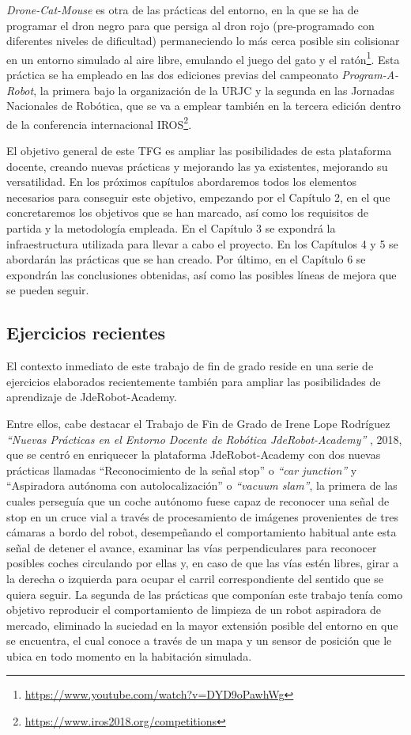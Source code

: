\textit{Drone-Cat-Mouse} es otra de las prácticas del entorno, en la que se ha de programar el dron negro para que persiga al dron rojo (pre-programado con diferentes niveles de dificultad) permaneciendo lo más cerca posible sin colisionar en un entorno simulado al aire libre, emulando el juego del gato y el ratón\footnote{\url{https://www.youtube.com/watch?v=DYD9oPawhWg}}. Esta práctica se  ha empleado en las dos ediciones previas del campeonato \textit{Program-A-Robot}, la primera bajo la organización de la URJC y la segunda en las Jornadas Nacionales de Robótica, que se va a emplear también en la tercera edición dentro de la conferencia internacional IROS\footnote{\url{https://www.iros2018.org/competitions}}.
\vspace{0.6cm}

El objetivo general de este TFG es ampliar las posibilidades de esta plataforma docente, creando nuevas prácticas y mejorando las ya existentes, mejorando su versatilidad. En los próximos capítulos abordaremos todos los elementos necesarios para conseguir este objetivo, empezando por el Capítulo 2, en el que concretaremos los objetivos que se han marcado, así como los requisitos de partida y la metodología empleada. En el Capítulo 3 se expondrá la infraestructura utilizada para llevar a cabo el proyecto. En los Capítulos 4 y 5 se abordarán las prácticas que se han creado. Por último, en el Capítulo 6 se expondrán las conclusiones obtenidas, así como las posibles líneas de mejora que se pueden seguir.

\subsection{Ejercicios recientes}
El contexto inmediato de este trabajo de fin de grado reside en una serie de ejercicios elaborados recientemente también para ampliar las posibilidades de aprendizaje de JdeRobot-Academy. 

Entre ellos, cabe destacar el Trabajo de Fin de Grado de Irene Lope Rodríguez \textit{“Nuevas Prácticas en el Entorno Docente de Robótica JdeRobot-Academy”} , 2018, que se centró en enriquecer la plataforma JdeRobot-Academy con dos nuevas prácticas llamadas “Reconocimiento de la señal stop” o \textit{“car junction”} y “Aspiradora autónoma con autolocalización” o \textit{“vacuum slam”}, la primera de las cuales perseguía que un coche autónomo fuese capaz de reconocer una señal de stop en un cruce vial a través de procesamiento de imágenes provenientes de tres cámaras a bordo del robot, desempeñando el comportamiento habitual ante esta señal de detener el avance, examinar las vías perpendiculares para reconocer posibles coches circulando por ellas y, en caso de que las vías estén libres, girar a la derecha o izquierda para ocupar el carril correspondiente del sentido que se quiera seguir. La segunda de las prácticas que componían este trabajo tenía como objetivo reproducir el comportamiento de limpieza de un robot aspiradora de mercado, eliminado la suciedad en la mayor extensión posible del entorno en que se encuentra, el cual conoce a través de un mapa y un sensor de posición que le ubica en todo momento en la habitación simulada.

